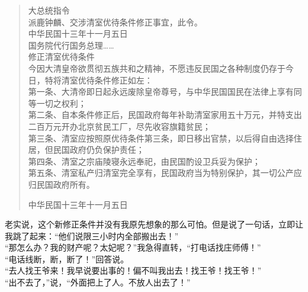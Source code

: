 \begin{quote}
	大总统指令\\

派鹿钟麟、交涉清室优待条件修正事宜，此令。\\

中华民国十三年十一月五日\\

国务院代行国务总理……\\

修正清室优待条件\\

今因大清皇帝欲贯彻五族共和之精神，不愿违反民国之各种制度仍存于今日，特将清室优待条件修正如左：\\

第一条、大清帝即日起永远废除皇帝尊号，与中华民国国民在法律上享有同等一切之权利；\\

第二条、自本条件修正后，民国政府每年补助清室家用五十万元，并特支出二百万元开办北京贫民工厂，尽先收容旗籍贫民；\\

第三条、清室应按照原优待条件第三条，即日移出官禁，以后得自由选择住居，但民国政府仍负保护责任；\\

第四条、清室之宗庙陵寝永远奉祀，由民国酌设卫兵妥为保护；\\

第五条、清室私产归清室完全享有，民国政府当为特别保护，其一切公产应归民国政府所有。\\

\begin{flushright}
	中华民国十三年十一月五日
\end{flushright}
\end{quote}

老实说，这个新修正条件并没有我原先想象的那么可怕。但是说了一句话，立即让我跳了起来：“他们说限三小时内全部搬出去！”\\

“那怎么办？我的财产呢？太妃呢？”我急得直转，“打电话找庄师傅！”\\

“电话线断，断，断了！”回答说。\\

“去人找王爷来！我早说要出事的！偏不叫我出去！找王爷！找王爷！”\\

“出不去了，”说，“外面把上了人。不放人出去了！”\\

